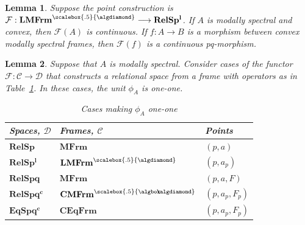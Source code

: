 \documentclass{article}[a4paper]
\newtheorem{lemma}{Lemma}%
\theoremstyle{definition}
\newcommand{\Ccal}{\mathcal{C}} %
\newcommand{\Dcal}{\mathcal{D}} %
\newcommand{\Fcal}{\mathcal{F}} %
\newcommand{\rels}{\mathbf{RelS}}
\newcommand{\relsp}{\mathbf{RelSp}}
\newcommand{\relspl}{\mathbf{RelSp^l}}
\newcommand{\relspq}{\mathbf{RelSpq}}
\newcommand{\relspqu}{\mathbf{RelSpq^u}}
\newcommand{\relspql}{\mathbf{RelSpq^l}}
\newcommand{\relspqc}{\mathbf{RelSpq^c}}
\newcommand{\eqspqc}{\mathbf{EqSpq^c}}
\newcommand{\mfrm}{\mathbf{MFrm}}
\newcommand{\mfrmbs}{\mathbf{MFrm}^{\scalebox{.5}{\algbox}}}
\newcommand{\mfrmds}{\mathbf{MFrm}^{\scalebox{.5}{\algdiamond}}}
\newcommand{\lmfrmds}{\mathbf{LMFrm}^{\scalebox{.5}{\algdiamond}}}
\newcommand{\cmfrms}{\mathbf{CMFrm}^{\scalebox{.5}{\algbox\!\!\!\algdiamond}}}
\newcommand{\ceqfrm}{\mathbf{CEqFrm}}
\newcommand{\Pbb}{\mathbb{P}}
\begin{document}
\begin{lemma}
\label{result:convexImpliesContinuous}
    Suppose the point construction is $\Fcal: \lmfrmds \longrightarrow \relspl$. If $A$ is modally spectral and convex, then $\Fcal(A)$ is continuous. If $f:A \longrightarrow B$ is a morphism between convex modally spectral frames, then $\Fcal (f)$ is a continuous pq-morphism.
\end{lemma}




\begin{lemma}
\label{result:spatialSep}
Suppose that $A$ is modally spectral. 
Consider cases of the functor $\Fcal: \Ccal \longrightarrow \Dcal$ that constructs a relational space from a frame with operators as in Table~\ref{table:spatiality}. In these cases, the unit $\phi_A$ is one-one.
\begin{table}[ht]
\begin{center}
\begin{tabular}{|l|l|l|}
\hline
Spaces,  $\Dcal$    & 
Frames, $\Ccal$  &
Points \\ 
\hline
$\relsp$   & $\mfrm$ & $(p,a)$ \\
$\relspl$   & $\lmfrmds$ & $(p,a_p)$\\
$\relspq$  & $\mfrm$ & $(p,a,F)$ \\ 
$\relspqc$ & $\cmfrms$ & $(p,a_p,F_p)$\\
$\eqspqc$  & $\ceqfrm$ & $(p,a_p,F_p)$ \\
\hline
\end{tabular}
\caption{Cases making $\phi_A$ one-one}
\label{table:spatiality}
\end{center}
\end{table} 
\end{lemma}
\end{document}
